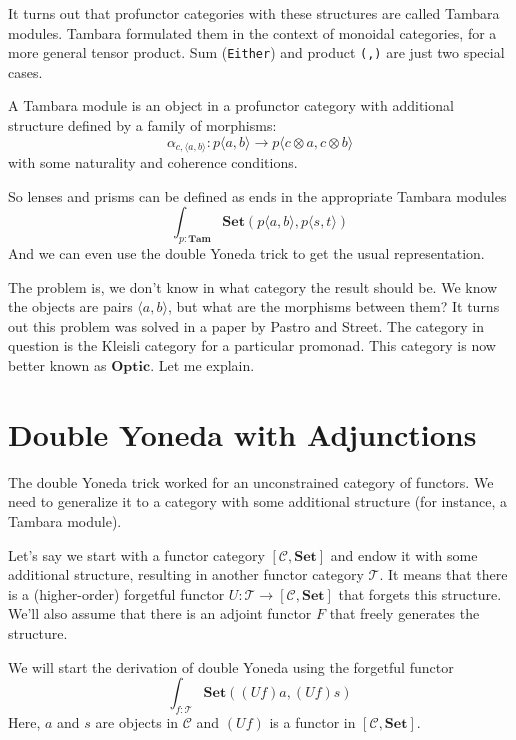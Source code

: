 \documentclass[11pt]{amsart}
\newcommand{\hask}[1]{\texttt{#1}}
\begin{document}
It turns out that profunctor categories with these structures are called Tambara modules. Tambara formulated them in the context of monoidal categories, for a more general tensor product. Sum (\hask{Either}) and product \hask{(,)} are just two special cases. 

A Tambara module is an object in a profunctor category with additional structure defined by a family of morphisms:
\[ \alpha_{c, \langle a, b \rangle} \colon p \langle a, b \rangle \to p\langle c \otimes a, c \otimes b \rangle \]
with some naturality and coherence conditions. 

So lenses and prisms can be defined as ends in the appropriate Tambara modules
\[ \int_{p \colon \mathbf{Tam}} \mathbf{Set}(p \langle a, b \rangle, p \langle s, t \rangle) \]
And we can even use the double Yoneda trick to get the usual representation. 

The problem is, we don't know in what category the result should be. We know the objects are pairs $\langle a, b \rangle$, but what are the morphisms between them? It turns out this problem was solved in a paper by Pastro and Street. The category in question is the Kleisli category for a particular promonad. This category is now better known as $\mathbf{Optic}$. Let me explain.

\section{Double Yoneda with Adjunctions}
The double Yoneda trick worked for an unconstrained category of functors. We need to generalize it to a category with some additional structure (for instance, a Tambara module). 

Let's say we start with a functor category $[\mathcal{C}, \mathbf{Set}]$ and endow it with some additional structure, resulting in another functor category $\mathcal{T}$. It means that there is a (higher-order) forgetful functor $U \colon \mathcal{T} \to [\mathcal{C}, \mathbf{Set}]$ that forgets this structure. We'll also assume that there is an adjoint functor $F$ that freely generates the structure.

We will start the derivation of double Yoneda using the forgetful functor
\[ \int_{f \colon \mathcal{T}} \mathbf{Set}( (U f) a, (U f) s)\]
Here, $a$ and $s$ are objects in $\mathcal{C}$ and $(U f)$ is a functor in $[\mathcal{C}, \mathbf{Set}]$.
\end{document}
